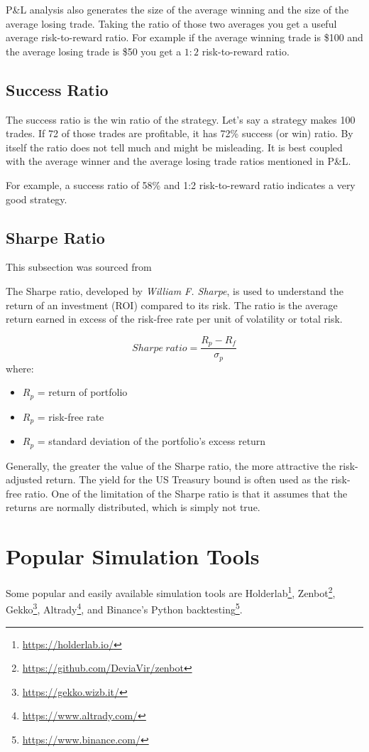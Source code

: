 P\&L analysis also generates the size of the average winning and the size of the average losing trade. Taking the ratio of those two averages you get a useful average risk-to-reward ratio. For example if the average winning trade is \$100 and the average losing trade is \$50 you get a $1:2$ risk-to-reward ratio.

\subsection*{Success Ratio}
The success ratio is the win ratio of the strategy. Let's say a strategy makes 100 trades. If 72 of those trades are profitable, it has 72\% success (or win) ratio. By itself the ratio does not tell much and might be misleading. It is best coupled with the average winner and the average losing trade ratios mentioned in P\&L.

For example, a success ratio of 58\% and 1:2 risk-to-reward ratio indicates a very good strategy.

\subsection*{Sharpe Ratio}
This subsection was sourced from \cite{investopedia:sharpe-ratio}

The Sharpe ratio, developed by \emph{William F. Sharpe}, is used to understand the return of an investment (ROI) compared to its risk. The ratio is the average return earned in excess of the risk-free rate per unit of volatility or total risk.

$$Sharpe\ ratio = \frac{R_p - R_f}{\sigma _p}$$
where:
\begin{itemize}
    \item $R_p$ = return of portfolio
    \item $R_p$ = risk-free rate
    \item $R_p$ = standard deviation of the portfolio's excess return
\end{itemize}

Generally, the greater the value of the Sharpe ratio, the more attractive the risk-adjusted return. The yield for the US Treasury bound is often used as the risk-free ratio. One of the limitation of the Sharpe ratio is that it assumes that the returns are normally distributed, which is simply not true.

\section{Popular Simulation Tools}
Some popular and easily available simulation tools are Holderlab\footnote{\url{https://holderlab.io/}}, Zenbot\footnote{\url{https://github.com/DeviaVir/zenbot}}, Gekko\footnote{\url{https://gekko.wizb.it/}}, Altrady\footnote{\url{https://www.altrady.com/}}, and Binance's Python backtesting\footnote{\url{https://www.binance.com/}}.

